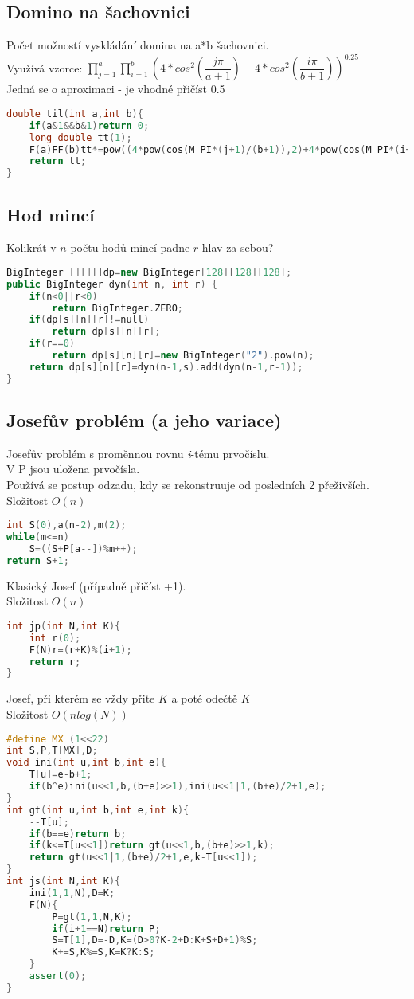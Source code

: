 \documentclass[11pt]{article}
\begin{document}
\subsection{Domino na šachovnici}
Počet možností vyskládání domina na a*b šachovnici.
\\Využívá vzorce: $\prod_{j=1}^a\prod_{i=1}^b(4*cos^2(\dfrac{j\pi}{a+1})+4*cos^2(\dfrac{i\pi}{b+1}))^{0.25}$
\\Jedná se o aproximaci - je vhodné přičíst 0.5
\begin{lstlisting}[language=C++]
double til(int a,int b){
    if(a&1&&b&1)return 0;
    long double tt(1);
    F(a)FF(b)tt*=pow((4*pow(cos(M_PI*(j+1)/(b+1)),2)+4*pow(cos(M_PI*(i+1)/(a+1)),2)),0.25);
    return tt;
}
\end{lstlisting}
\subsection{Hod mincí}
Kolikrát v $n$ počtu hodů mincí padne $r$ hlav za sebou?
\begin{lstlisting}[language=C++]
BigInteger [][][]dp=new BigInteger[128][128][128];
public BigInteger dyn(int n, int r) {
    if(n<0||r<0)
        return BigInteger.ZERO;
    if(dp[s][n][r]!=null)
        return dp[s][n][r];
    if(r==0)
        return dp[s][n][r]=new BigInteger("2").pow(n);
    return dp[s][n][r]=dyn(n-1,s).add(dyn(n-1,r-1));
}
\end{lstlisting}
\subsection{Josefův problém (a jeho variace)}
Josefův problém s proměnnou rovnu \textit{i}-tému prvočíslu.
\\V \textsf{P} jsou uložena prvočísla.
\\Používá se postup odzadu, kdy se rekonstruuje od posledních 2 přeživších.
\\Složitost $O(n)$
\begin{lstlisting}[language=C++]
int S(0),a(n-2),m(2);
while(m<=n)
    S=((S+P[a--])%m++);
return S+1;
\end{lstlisting}
Klasický Josef (případně přičíst +1).
\\Složitost $O(n)$
\begin{lstlisting}[language=C++]
int jp(int N,int K){
    int r(0);
    F(N)r=(r+K)%(i+1);
    return r;
}
\end{lstlisting}
Josef, při kterém se vždy přite $K$ a poté odečtě $K$
\\Složitost $O(nlog(N))$
\begin{lstlisting}[language=C++]
#define MX (1<<22)
int S,P,T[MX],D;
void ini(int u,int b,int e){
    T[u]=e-b+1;
    if(b^e)ini(u<<1,b,(b+e)>>1),ini(u<<1|1,(b+e)/2+1,e);
}
int gt(int u,int b,int e,int k){
    --T[u];
    if(b==e)return b;
    if(k<=T[u<<1])return gt(u<<1,b,(b+e)>>1,k);
    return gt(u<<1|1,(b+e)/2+1,e,k-T[u<<1]);
}
int js(int N,int K){
    ini(1,1,N),D=K;
    F(N){
        P=gt(1,1,N,K);
        if(i+1==N)return P;
        S=T[1],D=-D,K=(D>0?K-2+D:K+S+D+1)%S;
        K+=S,K%=S,K=K?K:S;
    }
    assert(0);
}
\end{lstlisting}
\end{document}
